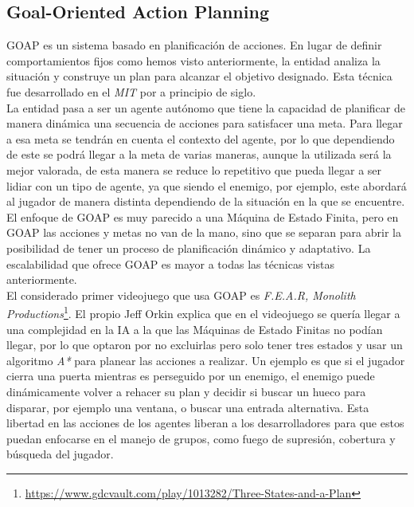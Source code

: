 \subsection{Goal-Oriented Action Planning}

GOAP es un sistema basado en planificación de acciones. En lugar de definir comportamientos fijos como hemos visto anteriormente, la entidad analiza la situación y construye un plan para alcanzar el objetivo designado.
Esta técnica fue desarrollado en el \textit{MIT} por \textit{\citet{GOAP_Jeff_Orkin}} a principio de siglo. \\

La entidad pasa a ser un agente autónomo que tiene la capacidad de planificar de manera dinámica una secuencia de acciones para satisfacer una meta. Para llegar a esa meta se tendrán en cuenta el contexto del agente, por lo que dependiendo de este se podrá llegar a la meta de varias maneras, aunque la utilizada será la mejor valorada, de esta manera se reduce lo repetitivo que pueda llegar a ser lidiar con un tipo de agente, ya que siendo el enemigo, por ejemplo, este abordará al jugador de manera distinta dependiendo de la situación en la que se encuentre.\\

El enfoque de GOAP es muy parecido a una Máquina de Estado Finita, pero en GOAP las acciones y metas no van de la mano, sino que se separan para abrir la posibilidad de tener un proceso de planificación dinámico y adaptativo.
La escalabilidad que ofrece GOAP es mayor a todas las técnicas vistas anteriormente.\\

El considerado primer videojuego que usa GOAP es \textit{F.E.A.R, Monolith Productions}\footnote{\url{https://www.gdcvault.com/play/1013282/Three-States-and-a-Plan}}. El propio Jeff Orkin explica que en el videojuego se quería llegar a una complejidad en la IA a la que las Máquinas de Estado Finitas no podían llegar, por lo que optaron por no excluirlas pero solo tener tres estados y usar un algoritmo \textit{A*} para planear las acciones a realizar. Un ejemplo es que si el jugador cierra una puerta mientras es perseguido por un enemigo, el enemigo puede dinámicamente volver a rehacer su plan y decidir si buscar un hueco para disparar, por ejemplo una ventana, o buscar una entrada alternativa. Esta libertad en las acciones de los agentes liberan a los desarrolladores para que estos puedan enfocarse en el manejo de grupos, como fuego de supresión, cobertura y búsqueda del jugador.\\


